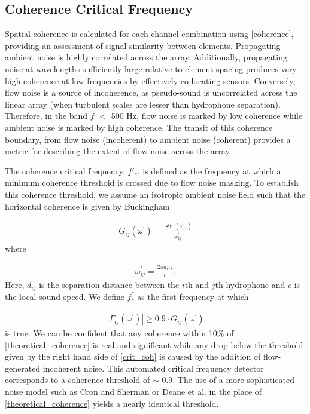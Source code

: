 \documentclass[12pt,journal,onecolumn]{IEEEtran}
\begin{document}
\subsection{Coherence Critical Frequency}
Spatial coherence is calculated for each channel combination using \eqref{coherence}, providing an assessment of signal similarity between elements. Propagating ambient noise is highly correlated across the array. Additionally, propagating noise at wavelengths sufficiently large relative to element spacing produces very high coherence at low frequencies by effectively co-locating sensors. Conversely, flow noise is a source of incoherence, as pseudo-sound is uncorrelated across the linear array (when turbulent scales are lesser than hydrophone separation). Therefore, in the band $f$ $<$ 500 Hz, flow noise is marked by low coherence while ambient noise is marked by high coherence. The transit of this coherence boundary, from flow noise (incoherent) to ambient noise (coherent) provides a metric for describing the extent of flow noise across the array. 

The coherence critical frequency, $f'_c$, is defined as the frequency at which a minimum coherence threshold is crossed due to flow noise masking. To establish this coherence threshold, we assume an isotropic ambient noise field such that the horizontal coherence is given by Buckingham \cite{buck}

\begin{align}
G_{ij}(\omega^\prime) = \frac{\sin (\omega_{ij}^\prime)}{\omega_{ij}^\prime}
\label{theoretical_coherence}
\end{align}
where

\begin{align}
\omega_{ij}^\prime = \frac{2\pi d_{ij}f }{c}.
\label{w}
\end{align}
Here, $d_{ij}$ is the separation distance between the $i$th and $j$th hydrophone and $c$ is the local sound speed. We define $f^\prime_c$ as the first frequency at which 

\begin{align}
|\Gamma_{ij}(\omega^\prime)|\geq  0.9\cdot G_{ij}(\omega^\prime)
\label{crit_coh}
\end{align}
is true. %
We can be confident that any coherence within 10\% of \eqref{theoretical_coherence} is real and significant while any drop below the threshold given by the right hand side of \eqref{crit_coh} is caused by the addition of flow-generated incoherent noise. %
This automated critical frequency detector corresponds to a coherence threshold of $\sim$ 0.9. The use of a more sophisticated noise model such as Cron and Sherman \cite{cron} or Deane et al. \cite{deane} in the place of \eqref{theoretical_coherence} yields a nearly identical threshold.
\end{document}
